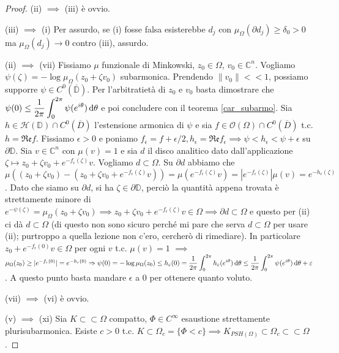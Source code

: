 \begin{proof}
  (ii) $\implies$ (iii) è ovvio.

  (iii) $\implies$ (i) Per assurdo, se (i) fosse falsa esisterebbe $d_j$ con $\mu_{\Omega}(\partial d_j) \ge \delta_0>0$ ma $\mu_{\Omega}(d_j) \longrightarrow 0$ contro (iii), assurdo.

  (ii) $\implies$ (vii) Fissiamo $\mu$ funzionale di Minkowski, $z_0 \in \Omega$, $v_0 \in \mathbb{C}^n$. Vogliamo $\psi(\zeta)=-\log{\mu_{\Omega}(z_0+\zeta v_0)}$ subarmonica. Prendendo $\|v_0\| << 1$, possiamo supporre $\psi \in C^0(\overline{\mathbb{D}})$.
  Per l'arbitratietà di $z_0$ e $v_0$ basta dimostrare che $\displaystyle \psi(0) \le \frac{1}{2\pi} \int_0^{2\pi} \psi(e^{i\theta})\mathop{}\!\mathrm{d}\theta$ e poi concludere con il teorema \ref{car_subarmo}.
  Sia $h \in \mathcal{H}(\mathbb{D}) \cap C^0(\overline{D})$ l'estensione armonica di $\psi$ e sia $f \in \mathcal{O}(\Omega) \cap C^0(\overline{D})$ t.c. $h=\mathfrak{Re}f$.
  Fissiamo $\epsilon>0$ e poniamo $f_{\epsilon}=f+\epsilon/2, h_{\epsilon}=\mathfrak{Re}f_{\epsilon} \implies \psi<h_{\epsilon}<\psi+\epsilon$ su $\partial\mathbb{D}$. Sia $v \in \mathbb{C}^n$ con $\mu(v)=1$ e sia $d$ il disco analitico dato dall'applicazione $\zeta \mapsto z_0+\zeta v_0+e^{-f_{\epsilon}(\zeta)}v$.
  Vogliamo $d \subset \Omega$. Su $\partial d$ abbiamo che $\mu((z_0+\zeta v_0)-(z_0+\zeta v_0+e^{-f_{\epsilon}(\zeta)}v))=\mu(e^{-f_{\epsilon}(\zeta)}v)=|e^{-f_{\epsilon}(\zeta)}|\mu(v)=e^{-h_{\epsilon}(\zeta)}$.
  Dato che siamo su $\partial d$, si ha $\zeta \in \partial\mathbb{D}$, perciò la quantità appena trovata è strettamente minore di $e^{-\psi(\zeta)}=\mu_{\Omega}(z_0+\zeta v_0) \implies z_0+\zeta v_0+e^{-f_{\epsilon}(\zeta)}v \in \Omega \implies \partial d \subset \Omega$ e questo per (ii) ci dà $d \subset \Omega$ (di questo non sono sicuro perché mi pare che serva $d \subset \Omega$ per usare (ii); purtroppo a quella lezione non c'ero, cercherò di rimediare).
  In particolare $z_0+e^{-f_{\epsilon}(0)}v \in \Omega$ per ogni $v$ t.c. $\mu(v)=1$ $\implies$ $\mu_{\Omega}(z_0) \ge |e^{-f_{\varepsilon}(0)}|=e^{-h_{\varepsilon}(0)} \Rightarrow \psi(0)=-\log{\mu_{\Omega}(z_0)} \le h_{\varepsilon}(0)=\displaystyle \frac{1}{2\pi} \int_0^{2\pi} h_{\varepsilon}(e^{i\theta})\mathop{}\!\mathrm{d}\theta \le \frac{1}{2\pi} \int_0^{2\pi} \psi(e^{i\theta})\mathop{}\!\mathrm{d}\theta+\varepsilon$.
  A questo punto basta mandare $\epsilon$ a $0$ per ottenere quanto voluto.

  (vii) $\implies$ (vi) è ovvio.

  (v) $\implies$ (xi) Sia $K \subset\subset \Omega$ compatto, $\Phi \in C^{\infty}$ esaustione strettamente plurisubarmonica. Esiste $c>0$ t.c. $K \subset \Omega_c=\{\Phi<c\} \implies \widehat{K}_{PSH(\Omega)} \subset \Omega_c \subset\subset \Omega$.


\end{proof}
